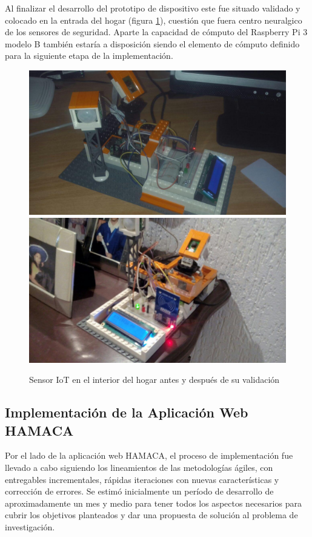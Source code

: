 Al finalizar el desarrollo del prototipo de dispositivo este fue situado validado y colocado en la entrada del hogar (figura \ref{fig:rpi3peter_zero}), cuestión que fuera centro neuralgico de los sensores de seguridad. Aparte la capacidad de cómputo del Raspberry Pi 3 modelo B también estaría a disposición siendo el elemento de cómputo definido para la siguiente etapa de la implementación.
\begin{figure}[!htb]
\centering
\includegraphics[scale=0.22]{./Figuras/rpi3peter_zero_proto.jpg}
\includegraphics[scale=0.17]{./Figuras/rpi3peter_zero.jpg}
\caption{Sensor IoT en el interior del hogar antes y después de su validación}
\label{fig:rpi3peter_zero}
\vspace*{-10pt}
\end{figure}


\subsection{Implementación de la Aplicación Web HAMACA}
Por el lado de la aplicación web HAMACA, el proceso de implementación fue llevado a cabo siguiendo los lineamientos de las metodologías ágiles, con entregables incrementales, rápidas iteraciones con nuevas características y corrección de errores. Se estimó inicialmente un período de desarrollo de aproximadamente un mes y medio para tener todos los aspectos necesarios para cubrir los objetivos planteados y dar una propuesta de solución al problema de investigación.\\

